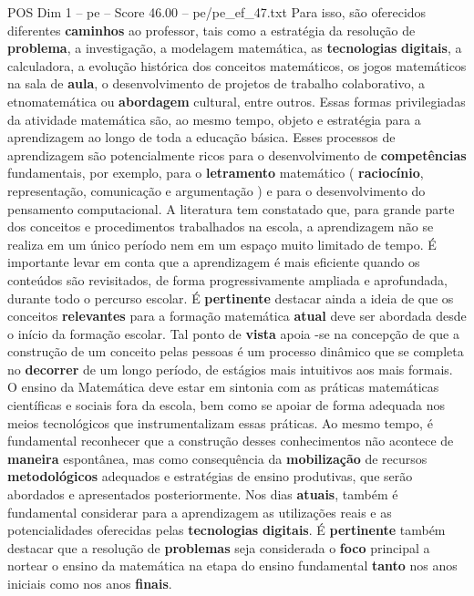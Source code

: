 \begin{textsample}{POS Dim 1 – pe – Score 46.00 – pe/pe\_ef\_47.txt}
Para isso, são oferecidos diferentes \textbf{caminhos} ao professor, tais como a estratégia da resolução de \textbf{problema}, a investigação, a modelagem matemática, as \textbf{tecnologias} \textbf{digitais}, a calculadora, a evolução histórica dos conceitos matemáticos, os jogos matemáticos na sala de \textbf{aula}, o desenvolvimento de projetos de trabalho colaborativo, a etnomatemática ou \textbf{abordagem} cultural, entre outros.
Essas formas privilegiadas da atividade matemática são, ao mesmo tempo, objeto e estratégia para a aprendizagem ao longo de toda a educação básica.
Esses processos de aprendizagem são potencialmente ricos para o desenvolvimento de \textbf{competências} fundamentais, por exemplo, para o \textbf{letramento} matemático ( \textbf{raciocínio}, representação, comunicação e argumentação ) e para o desenvolvimento do pensamento computacional.
A literatura tem constatado que, para grande parte dos conceitos e procedimentos trabalhados na escola, a aprendizagem não se realiza em um único período nem em um espaço muito limitado de tempo.
É importante levar em conta que a aprendizagem é mais eficiente quando os conteúdos são revisitados, de forma progressivamente ampliada e aprofundada, durante todo o percurso escolar.
É \textbf{pertinente} destacar ainda a ideia de que os conceitos \textbf{relevantes} para a formação matemática \textbf{atual} deve ser abordada desde o início da formação escolar.
Tal ponto de \textbf{vista} apoia -se na concepção de que a construção de um conceito pelas pessoas é um processo dinâmico que se completa no \textbf{decorrer} de um longo período, de estágios mais intuitivos aos mais formais.
O ensino da Matemática deve estar em sintonia com as práticas matemáticas científicas e sociais fora da escola, bem como se apoiar de forma adequada nos meios tecnológicos que instrumentalizam essas práticas.
Ao mesmo tempo, é fundamental reconhecer que a construção desses conhecimentos não acontece de \textbf{maneira} espontânea, mas como consequência da \textbf{mobilização} de recursos \textbf{metodológicos} adequados e estratégias de ensino produtivas, que serão abordados e apresentados posteriormente.
Nos dias \textbf{atuais}, também é fundamental considerar para a aprendizagem as utilizações reais e as potencialidades oferecidas pelas \textbf{tecnologias} \textbf{digitais}.
É \textbf{pertinente} também destacar que a resolução de \textbf{problemas} seja considerada o \textbf{foco} principal a nortear o ensino da matemática na etapa do ensino fundamental \textbf{tanto} nos anos iniciais como nos anos \textbf{finais}.

\end{textsample}
